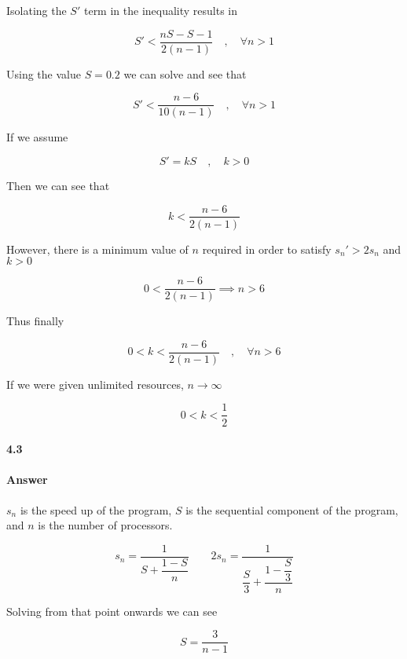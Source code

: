 \documentclass[12pt,letterpaper,titlepage]{article}
\begin{document}
  Isolating the $S'$ term in the inequality results in
  
  \begin{equation*}
  S' < \frac{nS - S - 1}{2(n - 1)} \quad,\quad \forall n > 1
  \end{equation*}
  
  Using the value $S=0.2$ we can solve and see that
  
  \begin{equation*}
  S' < \frac{n-6}{10(n-1)} \quad,\quad \forall n > 1
  \end{equation*}
  
  If we assume
  
  \begin{equation*}
  S' = kS \quad,\quad k > 0
  \end{equation*}
  
  Then we can see that
  
  \begin{equation*}
  k < \frac{n-6}{2(n-1)}
  \end{equation*}
  
  However, there is a minimum value of $n$ required in order to satisfy $s_n' > 2s_n$ and $k>0$
  
  \begin{equation*}
  0 < \frac{n-6}{2(n-1)} \implies n > 6
  \end{equation*}
  
  Thus finally
  
  \begin{equation*}
  0 < k < \frac{n-6}{2(n-1)} \quad,\quad \forall n > 6
  \end{equation*}
  
  If we were given unlimited resources, $n\rightarrow\infty$
  
  \begin{equation*}
  0 < k < \frac{1}{2}
  \end{equation*}
  
  \paragraph{4.3}
  
  \paragraph{Answer} $s_n$ is the speed up of the program, $S$ is the sequential component of the program, and $n$ is the number of processors.
  
  \begin{equation*}
  s_n = \dfrac{1}{S + \dfrac{1 - S}{n}} \quad\quad
  2s_n = \dfrac{1}{\dfrac{S}{3} + \dfrac{1 - \dfrac{S}{3}}{n}}
  \end{equation*}
  
  Solving from that point onwards we can see
  
  \begin{equation*}
  S = \frac{3}{n - 1}
  \end{equation*}
  
\end{document}
